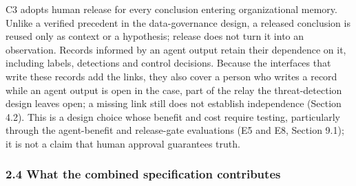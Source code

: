 \documentclass[
  11pt,
]{article}
\begin{document}
C3 adopts human release for every conclusion entering organizational
memory. Unlike a verified precedent in the data-governance design, a
released conclusion is reused only as context or a hypothesis; release
does not turn it into an observation. Records informed by an agent
output retain their dependence on it, including labels, detections and
control decisions. Because the interfaces that write these records add
the links, they also cover a person who writes a record while an agent
output is open in the case, part of the relay the threat-detection
design leaves open; a missing link still does not establish independence
(Section 4.2). This is a design choice whose benefit and cost require
testing, particularly through the agent-benefit and release-gate
evaluations (E5 and E8, Section 9.1); it is not a claim that human
approval guarantees truth.

\hypertarget{what-the-combined-specification-contributes}{%
\subsubsection{2.4 What the combined specification
contributes}\label{what-the-combined-specification-contributes}}
\end{document}
